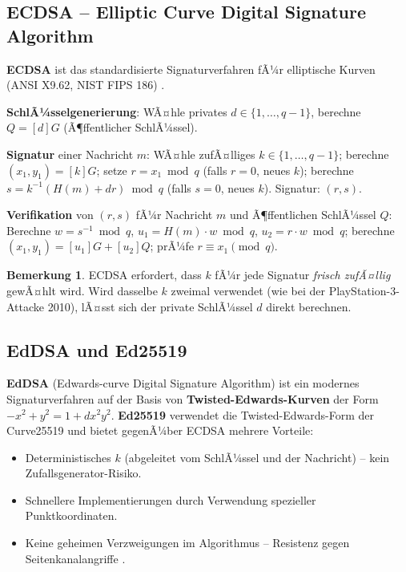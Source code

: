 ﻿\documentclass[a4paper,12pt]{scrreprt}
\theoremstyle{definition}
\newtheorem{bemerkung}{Bemerkung}[section]
\begin{document}
\subsection{ECDSA -- Elliptic Curve Digital Signature Algorithm}

\textbf{ECDSA} ist das standardisierte Signaturverfahren fÃ¼r elliptische Kurven (ANSI X9.62, NIST FIPS 186) \cite{GMR88}.

\textbf{SchlÃ¼sselgenerierung}: WÃ¤hle privates $d \in \{1,\ldots,q-1\}$, berechne $Q = [d]G$ (Ã¶ffentlicher SchlÃ¼ssel).

\textbf{Signatur} einer Nachricht $m$: WÃ¤hle zufÃ¤lliges $k \in \{1,\ldots,q-1\}$; berechne $(x_1, y_1) = [k]G$; setze $r = x_1 \bmod q$ (falls $r=0$, neues $k$); berechne $s = k^{-1}(H(m) + dr) \bmod q$ (falls $s=0$, neues $k$). Signatur: $(r, s)$.

\textbf{Verifikation} von $(r,s)$ fÃ¼r Nachricht $m$ und Ã¶ffentlichen SchlÃ¼ssel $Q$: Berechne $w = s^{-1} \bmod q$, $u_1 = H(m)\cdot w \bmod q$, $u_2 = r\cdot w \bmod q$; berechne $(x_1,y_1) = [u_1]G + [u_2]Q$; prÃ¼fe $r \equiv x_1 \pmod{q}$.

\begin{bemerkung}
ECDSA erfordert, dass $k$ fÃ¼r jede Signatur \emph{frisch zufÃ¤llig} gewÃ¤hlt wird. Wird dasselbe $k$ zweimal verwendet (wie bei der PlayStation-3-Attacke 2010), lÃ¤sst sich der private SchlÃ¼ssel $d$ direkt berechnen.
\end{bemerkung}

\subsection{EdDSA und Ed25519}

\textbf{EdDSA} (Edwards-curve Digital Signature Algorithm) \cite{BLC+11} ist ein modernes Signaturverfahren auf der Basis von \textbf{Twisted-Edwards-Kurven} der Form $-x^2 + y^2 = 1 + dx^2y^2$. \textbf{Ed25519} verwendet die Twisted-Edwards-Form der Curve25519 und bietet gegenÃ¼ber ECDSA mehrere Vorteile:
\begin{itemize}
    \item Deterministisches $k$ (abgeleitet vom SchlÃ¼ssel und der Nachricht) -- kein Zufallsgenera\-tor-Risiko.
    \item Schnellere Implementierungen durch Verwendung spezieller Punktkoordinaten.
    \item Keine geheimen Verzweigungen im Algorithmus -- Resistenz gegen Seitenkanalangriffe \cite{Koc96}.
\end{itemize}
\end{document}
